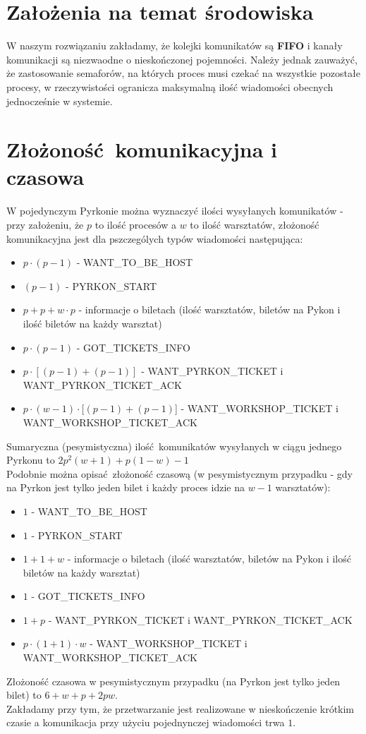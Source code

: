 \documentclass[10pt,a4paper]{article}
\begin{document}
\section{Założenia na temat środowiska}
W naszym rozwiązaniu zakładamy, że kolejki komunikatów są \textbf{FIFO} i kanały komunikacji są niezwaodne o nieskończonej pojemności.
Należy jednak zauważyć, że zastosowanie semaforów, na których proces musi czekać na wszystkie pozostałe procesy, w rzeczywistości ogranicza
maksymalną ilość wiadomości obecnych jednocześnie w systemie.

\section{Złożoność komunikacyjna i czasowa}
W pojedynczym Pyrkonie można wyznaczyć ilości wysyłanych komunikatów - przy założeniu, że $p$ to ilość procesów a $w$ to ilość warsztatów,
złożoność komunikacyjna jest dla pszczególych typów wiadomości następująca:\\
\begin{itemize}
    \item $p \cdot (p-1)$ - WANT\_TO\_BE\_HOST
    \item $(p-1)$ - PYRKON\_START
    \item $p + p + w\cdot p$ - informacje o biletach (ilość warsztatów, biletów na Pykon i ilość biletów na każdy warsztat)
    \item $p \cdot (p-1)$ - GOT\_TICKETS\_INFO
    \item $p \cdot [(p-1) + (p-1)]$ - WANT\_PYRKON\_TICKET i WANT\_PYRKON\_TICKET\_ACK
    \item $p \cdot (w-1) \cdot [(p-1) + (p-1)$] - WANT\_WORKSHOP\_TICKET i WANT\_WORKSHOP\_TICKET\_ACK
\end{itemize}
Sumaryczna (pesymistyczna) ilość komunikatów wysyłanych w ciągu jednego Pyrkonu to
$2p^2 (w+1) + p(1-w) - 1$\\

Podobnie można opisać złożoność czasową (w pesymistycznym przypadku - gdy na Pyrkon jest tylko jeden bilet i każdy proces idzie na $w-1$ warsztatów):\\
\begin{itemize}
    \item $1$ - WANT\_TO\_BE\_HOST
    \item $1$ - PYRKON\_START
    \item $1 + 1 + w$ - informacje o biletach (ilość warsztatów, biletów na Pykon i ilość biletów na każdy warsztat)
    \item $1$ - GOT\_TICKETS\_INFO
    \item $1 + p$ - WANT\_PYRKON\_TICKET i WANT\_PYRKON\_TICKET\_ACK
    \item $p\cdot (1+1) \cdot w$ - WANT\_WORKSHOP\_TICKET i WANT\_WORKSHOP\_TICKET\_ACK
\end{itemize}

Złożoność czasowa w pesymistycznym przypadku (na Pyrkon jest tylko jeden bilet) to $6 + w + p + 2 p w$.\\
Zakładamy przy tym, że przetwarzanie jest realizowane w nieskończenie krótkim czasie a komunikacja przy użyciu
pojednynczej wiadomości trwa $1$.
\end{document}
